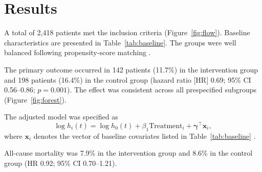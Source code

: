 \section{Results}
\label{sec:results}

A total of 2,418 patients met the inclusion criteria (Figure~\ref{fig:flow}). Baseline characteristics are presented in Table~\ref{tab:baseline}. The groups were well balanced following propensity-score matching \cite{austin2011introduction}.

The primary outcome occurred in 142 patients (11.7\%) in the intervention group and 198 patients (16.4\%) in the control group (hazard ratio [HR] 0.69; 95\% CI 0.56--0.86; $p = 0.001$). The effect was consistent across all prespecified subgroups (Figure~\ref{fig:forest}).

The adjusted model was specified as
\begin{equation}
  \log h_i(t) = \log h_0(t) + \beta_1 \text{Treatment}_i + \boldsymbol{\gamma}^\top \mathbf{x}_i ,
  \label{eq:cox}
\end{equation}
where $\mathbf{x}_i$ denotes the vector of baseline covariates listed in Table~\ref{tab:baseline} \cite{cox1972regression, therneau2000modeling}.

All-cause mortality was 7.9\% in the intervention group and 8.6\% in the control group (HR 0.92; 95\% CI 0.70--1.21).
